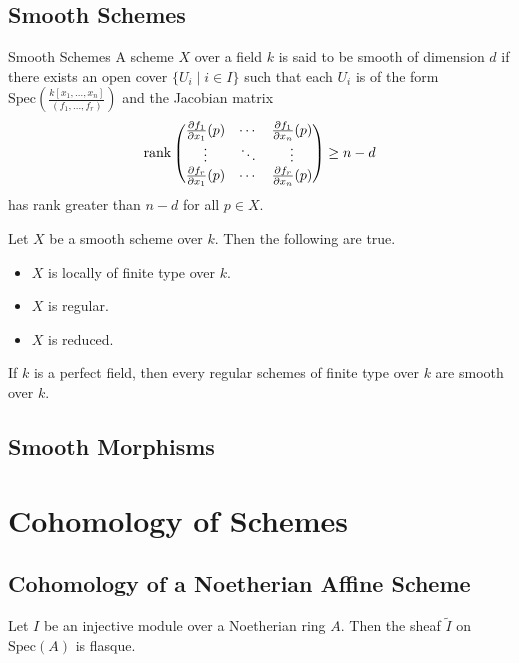 \documentclass[a4paper]{article}
\begin{document}
\subsection{Smooth Schemes}
\begin{defn}{Smooth Schemes}{} A scheme $X$ over a field $k$ is said to be smooth of dimension $d$ if there exists an open cover $\{U_i\;|\;i\in I\}$ such that each $U_i$ is of the form $\text{Spec}\left(\frac{k[x_1,\dots,x_n]}{(f_1,\dots,f_r)}\right)$ and the Jacobian matrix $$\rank\begin{pmatrix}
\frac{\partial f_1}{\partial x_1}(p) & \cdots & \frac{\partial f_1}{\partial x_n}(p)\\
\vdots & \ddots & \vdots\\
\frac{\partial f_r}{\partial x_1}(p) & \cdots & \frac{\partial f_r}{\partial x_n}(p)
\end{pmatrix}\geq n-d$$ has rank greater than $n-d$ for all $p\in X$. 
\end{defn}

\begin{prp}{}{} Let $X$ be a smooth scheme over $k$. Then the following are true. 
\begin{itemize}
\item $X$ is locally of finite type over $k$. 
\item $X$ is regular. 
\item $X$ is reduced. 
\end{itemize}
\end{prp}

\begin{thm}{}{} If $k$ is a perfect field, then every regular schemes of finite type over $k$ are smooth over $k$. 
\end{thm}

\subsection{Smooth Morphisms}

\pagebreak
\section{Cohomology of Schemes}
\subsection{Cohomology of a Noetherian Affine Scheme}
\begin{prp}{}{} Let $I$ be an injective module over a Noetherian ring $A$. Then the sheaf $\tilde{I}$ on $\text{Spec}(A)$ is flasque. 
\end{prp}
\end{document}
